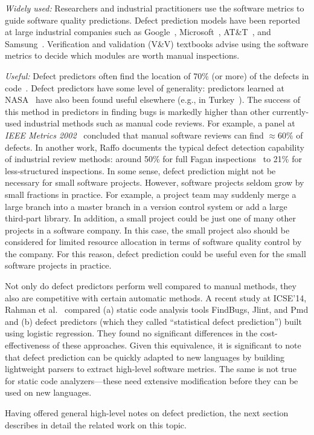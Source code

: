 {\em Widely used:}  Researchers and industrial practitioners  use the software metrics to guide software
quality predictions.
 Defect prediction models have been reported
  at large industrial companies such as Google~\cite{lewis13}, Microsoft~\cite{Nagappan06}, AT\&T~\cite{Ostrand05}, and Samsung~\cite{Kim15remi}.
Verification and validation (V\&V) textbooks
\cite{rakitin01} advise using the software metrics
to decide which modules are worth manual inspections.


{\em Useful:}
Defect predictors often  find the location of  70\% (or more)
of the defects in code~\cite{me07b}.
Defect predictors have some level of generality:
predictors learned at NASA~\cite{me07b} have also been found useful elsewhere
(e.g., in Turkey~\cite{tosun10,tosun09}).
The success of this method in  predictors in finding bugs is markedly
higher than other currently-used
industrial
methods such as manual code reviews. For example,
a  panel at {\em IEEE Metrics
2002}~\cite{shu02} concluded that manual software  reviews can find ${\approx} 60\%$
of defects.
In another work,
Raffo documents the typical defect detection capability of
industrial review methods:   around 50\%
 for full Fagan inspections~\cite{fagan76} to
21\% for less-structured inspections.
In some sense, defect prediction might not be necessary for small software projects.
However, software projects seldom grow by small fractions in practice. For example, a project team may suddenly merge a large branch into a master branch in a version control system or add a large third-part library. In addition, a small project could be just one of many other projects in a software company. In this case, the small project also should be considered for limited resource allocation in terms of software quality control by the company. For this reason, defect prediction could be useful even for the small software projects in practice.

Not only do defect predictors perform well compared to manual methods,
they also are competitive with certain automatic methods.
A recent study at ICSE'14, Rahman et al.~\cite{rahman14:icse} compared
(a) static code analysis tools FindBugs, Jlint, and Pmd and (b) defect predictors
(which they called ``statistical defect prediction'') built using logistic regression.
They found  no significant differences in the cost-effectiveness
of these  approaches. Given this equivalence, it is significant to note that
defect prediction can be quickly adapted to new languages by building lightweight
parsers to extract high-level software metrics. The same is not true for static code analyzers---these need extensive modification before they can be used on new
languages.

Having offered general high-level notes on defect prediction,
the next section describes in detail the related work on this topic.
